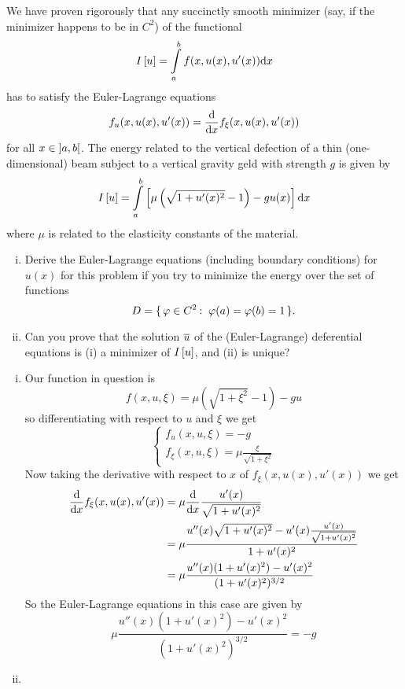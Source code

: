 \documentclass[12pt]{memoir}
\begin{document}
\begin{Ej}
    We have proven rigorously that any succinctly smooth minimizer (say, if the minimizer happens to be in $C^2$) of the functional
    $$I\left\lbrack u\right\rbrack=\int\limits_a^b f(x,u(x),u'(x))\dd x $$
    has to satisfy the Euler-Lagrange equations
    $$f_u(x,u(x),u'(x))=\dv{x}f_\xi(x,u(x),u'(x))$$
    for all $x\in\left\rbrack a,b\right\lbrack$. The energy related to the vertical defection of a thin (one-dimensional) beam subject to a vertical gravity geld with strength $g$ is given by
    $$I\left\lbrack u\right\rbrack=\int\limits_a^b \left\lbrack\mu\left(\sqrt{1+u'(x)^2}-1\right)-gu(x)\right\rbrack\dd x $$
    where $\mu$ is related to the elasticity constants of the material.
    \begin{enumerate}[i)]
        \item Derive the Euler-Lagrange equations (including boundary conditions) for $u(x)$ for this problem if you
        try to minimize the energy over the set of functions
        $$D=\set{\vf\in C^2\:\ \vf(a)=\vf(b)=1}.$$
        \item Can you prove that the solution $\overline u$ of the (Euler-Lagrange) deferential equations is (i) a minimizer of
        $I\left\lbrack u\right\rbrack$, and (ii) is unique?
    \end{enumerate}
\end{Ej}

\begin{ptcbr}
    \begin{enumerate}[i)]
        \item Our function in question is 
        $$f(x,u,\xi)=\mu\left(\sqrt{1+\xi^2}-1\right)-gu$$
        so differentiating with respect to $u$ and $\xi$ we get 
        $$
        \begin{cases}
            f_u(x,u,\xi)=-g\\
            f_\xi(x,u,\xi)=\mu\frac{\xi}{\sqrt{1+\xi^2}}
        \end{cases}
        $$
        Now taking the derivative with respect to $x$ of $f_{\xi}(x,u(x),u'(x))$ we get 
        \begin{align*}
            \dv{x}f_{\xi}(x,u(x),u'(x))&=\mu\dv{x}\frac{u'(x)}{\sqrt{1+u'(x)^2}}\\
            &=\mu\frac{u''(x)\sqrt{1+u'(x)^2}-u'(x)\frac{u'(x)}{\sqrt{1+u'(x)^2}}}{1+u'(x)^2}\\
            &=\mu\frac{u''(x)(1+u'(x)^2)-u'(x)^2}{(1+u'(x)^2)^{3/2}}
        \end{align*}
    So the Euler-Lagrange equations in this case are given by
    $$\mu\frac{u''(x)(1+u'(x)^2)-u'(x)^2}{(1+u'(x)^2)^{3/2}}=-g$$
    \item {}
    \end{enumerate}
\end{ptcbr}
\end{document}
